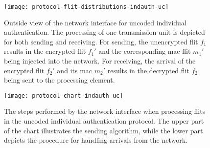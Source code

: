 \begin{figure}
    \centering
    \texttt{[image: protocol-flit-distributions-indauth-uc]}
    \caption[Uncoded ind. auth., outside view]{Outside view of the network interface for uncoded individual authentication. The processing of one
    transmission unit is depicted for both sending and receiving. For sending, the unencrypted flit $f_1$ results in the encrypted flit $f_1'$ and the
    corresponding \gls{mac} flit $m_1'$ being injected into the network. For receiving, the arrival of the encrypted flit $f_2'$ and its \gls{mac}
    $m_2'$ results in the decrypted flit $f_2$ being sent to the processing element.}
    \label{fig:protflitdistindauthuc}
\end{figure}

\begin{figure}
    \centering
    \texttt{[image: protocol-chart-indauth-uc]}
    \caption[Uncoded ind. auth., detailed procedure]{The steps performed by the network interface when processing flits in the uncoded individual
    authentication protocol. The upper part of the chart illustrates the sending algorithm, while the lower part depicts the procedure for handling
    arrivals from the network.}
    \label{fig:protchartindauthuc}
\end{figure}

